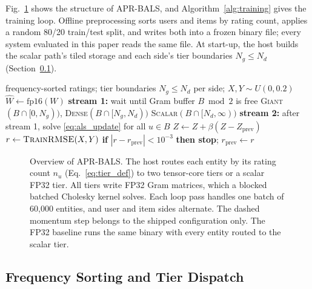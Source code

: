 Fig.~\ref{fig:framework} shows the structure of APR-BALS, and Algorithm~\ref{alg:training} gives the training loop. Offline preprocessing sorts users and items by rating count, applies a random 80/20 train/test split, and writes both into a frozen binary file; every system evaluated in this paper reads the same file. At start-up, the host builds the scalar path's tiled storage and each side's tier boundaries $N_g \le N_d$ (Section~\ref{ssec:dispatch}).

\begin{algorithm}[!t]
\caption{APR-BALS training loop (host side)}
\label{alg:training}
\small
\begin{algorithmic}[1]
\REQUIRE frequency-sorted ratings; tier boundaries $N_g \le N_d$ per side; $X, Y \sim U(0, 0.2)$
    \STATE $\widehat{W} \gets \mathrm{fp16}(W)$ 
      \STATE \textbf{stream 1:} wait until Gram buffer $B \bmod 2$ is free \label{alg:tr:wait}
      \STATE \quad \textsc{Giant}$(B \cap [0, N_g))$, \textsc{Dense}$(B \cap [N_g, N_d))$
      \STATE \quad \textsc{Scalar}$(B \cap [N_d, \infty))$ 
      \STATE \textbf{stream 2:} after stream 1, solve \eqref{eq:als_update} for all $u \in B$ \label{alg:tr:solve}
    \ENDFOR
    \STATE $Z \gets Z + \beta (Z - Z_{\text{prev}})$ 
  \ENDFOR
    \STATE $r \gets \textsc{TrainRMSE}(X, Y)$
    \STATE \textbf{if} $|r - r_{\text{prev}}| < 10^{-3}$ \textbf{then stop}; $r_{\text{prev}} \gets r$
  \ENDIF
\ENDFOR
\end{algorithmic}
\end{algorithm}

\begin{figure}[!t]
\centering

\caption{Overview of APR-BALS. The host routes each entity by its rating count $n_u$ (Eq.~\ref{eq:tier_def}) to two tensor-core tiers or a scalar FP32 tier. All tiers write FP32 Gram matrices, which a blocked batched Cholesky kernel solves. Each loop pass handles one batch of 60{,}000 entities, and user and item sides alternate. The dashed momentum step belongs to the shipped configuration only. The FP32 baseline runs the same binary with every entity routed to the scalar tier.}
\label{fig:framework}
\end{figure}

\subsection{Frequency Sorting and Tier Dispatch}
\label{ssec:dispatch}

